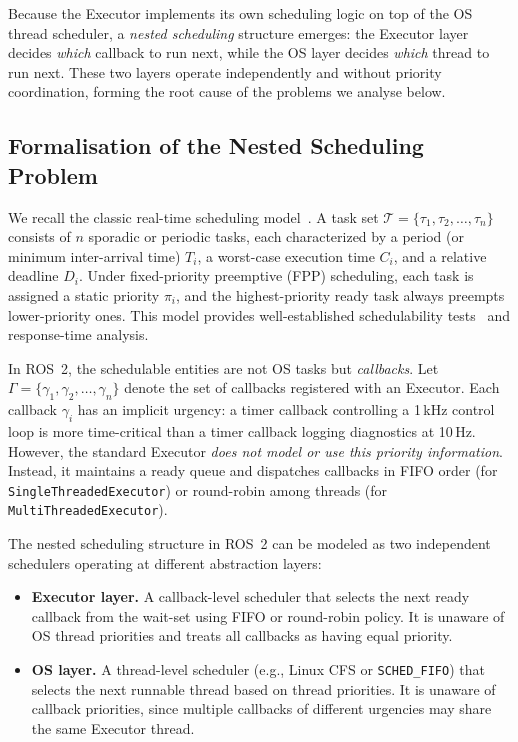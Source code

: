 Because the Executor implements its own scheduling logic on top of the OS thread scheduler, a \emph{nested scheduling} structure emerges: the Executor layer decides \emph{which} callback to run next, while the OS layer decides \emph{which} thread to run next.
These two layers operate independently and without priority coordination, forming the root cause of the problems we analyse below.

\subsection{Formalisation of the Nested Scheduling Problem}

We recall the classic real-time scheduling model~\cite{liu1973scheduling}.
A task set $\mathcal{T} = \{\tau_1, \tau_2, \dots, \tau_n\}$ consists of $n$ sporadic or periodic tasks, each characterized by a period (or minimum inter-arrival time) $T_i$, a worst-case execution time $C_i$, and a relative deadline $D_i$.
Under fixed-priority preemptive (FPP) scheduling, each task is assigned a static priority $\pi_i$, and the highest-priority ready task always preempts lower-priority ones.
This model provides well-established schedulability tests~\cite{liu1973scheduling} and response-time analysis.

In ROS~2, the schedulable entities are not OS tasks but \emph{callbacks}.
Let $\Gamma = \{\gamma_1, \gamma_2, \dots, \gamma_n\}$ denote the set of callbacks registered with an Executor.
Each callback $\gamma_i$ has an implicit urgency: a timer callback controlling a 1\,kHz control loop is more time-critical than a timer callback logging diagnostics at 10\,Hz.
However, the standard Executor \emph{does not model or use this priority information}.
Instead, it maintains a ready queue and dispatches callbacks in FIFO order (for \texttt{SingleThreadedExecutor}) or round-robin among threads (for \texttt{MultiThreadedExecutor}).

The nested scheduling structure in ROS~2 can be modeled as two independent schedulers operating at different abstraction layers:
\begin{itemize}
    \item \textbf{Executor layer.} A callback-level scheduler that selects the next ready callback from the wait-set using FIFO or round-robin policy. It is unaware of OS thread priorities and treats all callbacks as having equal priority.
    \item \textbf{OS layer.} A thread-level scheduler (e.g., Linux CFS or \texttt{SCHED\_FIFO}) that selects the next runnable thread based on thread priorities. It is unaware of callback priorities, since multiple callbacks of different urgencies may share the same Executor thread.
\end{itemize}

